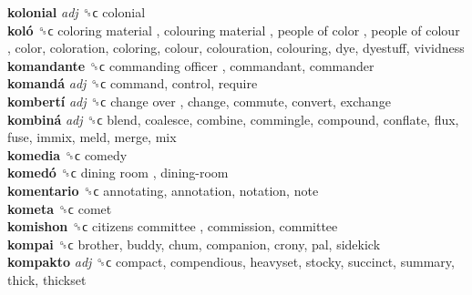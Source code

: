 \textbf{kolonial} \emph{adj}  ␝ϲ  colonial  \\
\textbf{koló} ␝ϲ   coloring material ,  colouring material ,  people of color ,  people of colour , color, coloration, coloring, colour, colouration, colouring, dye, dyestuff, vividness  \\
\textbf{komandante} ␝ϲ   commanding officer , commandant, commander  \\
\textbf{komandá} \emph{adj}  ␝ϲ  command, control, require  \\
\textbf{kombertí} \emph{adj}  ␝ϲ   change over , change, commute, convert, exchange  \\
\textbf{kombiná} \emph{adj}  ␝ϲ  blend, coalesce, combine, commingle, compound, conflate, flux, fuse, immix, meld, merge, mix  \\
\textbf{komedia} ␝ϲ  comedy  \\
\textbf{komedó} ␝ϲ   dining room ,  dining-room   \\
\textbf{komentario} ␝ϲ  annotating, annotation, notation, note  \\
\textbf{kometa} ␝ϲ  comet  \\
\textbf{komishon} ␝ϲ   citizens committee , commission, committee  \\
\textbf{kompai} ␝ϲ  brother, buddy, chum, companion, crony, pal, sidekick  \\
\textbf{kompakto} \emph{adj}  ␝ϲ  compact, compendious, heavyset, stocky, succinct, summary, thick, thickset  \\
